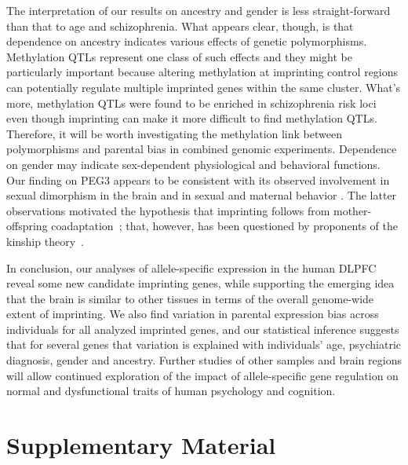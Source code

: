 \documentclass[letterpaper]{article}
\begin{document}
The interpretation of our results on ancestry and gender is less
straight-forward than that to age and schizophrenia.  What appears clear,
though, is that dependence on ancestry indicates various effects of genetic
polymorphisms.   Methylation QTLs represent one class of such effects and they
might be particularly important because altering methylation at imprinting
control regions can potentially regulate multiple imprinted genes within the
same cluster.  What's more, methylation QTLs were found to be enriched in
schizophrenia risk loci~\cite{Hannon2016} even though imprinting can make it more difficult to find methylation QTLs.  Therefore, it will be worth
investigating the methylation link between polymorphisms and parental bias in
combined genomic experiments.  Dependence on gender may indicate
sex-dependent physiological and behavioral functions.  Our finding on PEG3
appears to be consistent with its observed involvement in sexual dimorphism in
the brain and in sexual and maternal behavior \cite{Broad2009}.  The latter
observations motivated the hypothesis that imprinting follows from
mother-offspring coadaptation~\cite{Keverne2015}; that, however, has been
questioned by proponents of the kinship theory~\cite{Haig2014}.

In conclusion, our analyses of allele-specific expression in the human DLPFC
reveal some new candidate imprinting genes, while supporting the emerging idea
that the brain is similar to other tissues in terms of the overall genome-wide
extent of imprinting.  We also find variation in parental expression bias
across individuals for all analyzed imprinted genes, and our statistical
inference suggests that for several genes that variation is explained with
individuals’ age, psychiatric diagnosis, gender and ancestry. Further studies
of other samples and brain regions will allow continued exploration of the
impact of allele-specific gene regulation on normal and dysfunctional traits
of human psychology and cognition.




\newpage

\section{Supplementary Material}

\newpage


\setcounter{figure}{0}
\makeatletter 
\renewcommand{\thefigure}{S\@arabic\c@figure}
\makeatother
\end{document}
